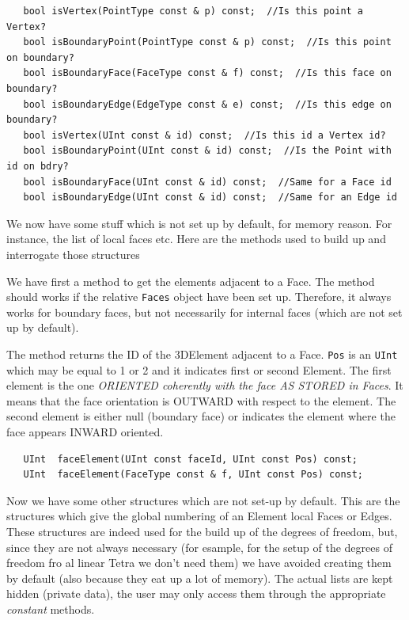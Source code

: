 \begin{verbatim}
   bool isVertex(PointType const & p) const;  //Is this point a Vertex?
   bool isBoundaryPoint(PointType const & p) const;  //Is this point on boundary?
   bool isBoundaryFace(FaceType const & f) const;  //Is this face on boundary?
   bool isBoundaryEdge(EdgeType const & e) const;  //Is this edge on boundary?
   bool isVertex(UInt const & id) const;  //Is this id a Vertex id?
   bool isBoundaryPoint(UInt const & id) const;  //Is the Point with id on bdry?
   bool isBoundaryFace(UInt const & id) const;  //Same for a Face id
   bool isBoundaryEdge(UInt const & id) const;  //Same for an Edge id
\end{verbatim}
We now have some stuff which is not set up by default, for memory
reason. For instance, the list of local faces etc. Here are the
methods used to build up and interrogate those structures

We have first a method to get the elements adjacent to a Face. The
method should works if the relative \texttt{Faces} object have been
set up. Therefore, it always works for boundary faces, but not
necessarily for internal faces (which are not set up by default).
 
The method returns the ID of the 3DElement adjacent to a Face.
\texttt{Pos} is an \texttt{UInt} which may be equal to 1 or 2 and it
indicates first or second Element. The first element is the one
\emph{ORIENTED coherently with the face AS STORED in Faces}. It means that
the face orientation is OUTWARD with respect to the element. The second
element is either null (boundary face) or indicates the element where
the face appears INWARD oriented.

\begin{verbatim}
   UInt  faceElement(UInt const faceId, UInt const Pos) const; 
   UInt  faceElement(FaceType const & f, UInt const Pos) const;  
\end{verbatim}

Now we have some other structures which are not set-up by default.  This
are the structures which give the global numbering of an Element local
Faces or Edges. These structures are indeed used for the build up of the
degrees of freedom, but, since they are not always necessary (for
esample, for the setup of the degrees of freedom fro al linear Tetra we
don't need them) we have avoided creating them by default (also because
they eat up a lot of memory).  The actual lists are kept hidden (private
data), the user may only access them through the appropriate
\emph{constant} methods.

